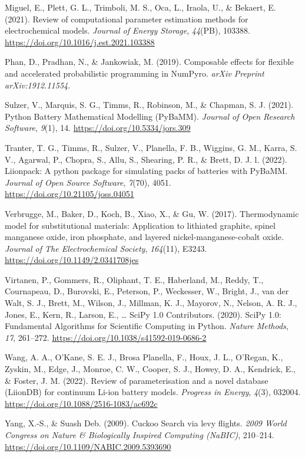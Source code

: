 \documentclass[
]{article}
\newlength{\cslhangindent}
\newenvironment{CSLReferences}[2] %
 {\begin{list}{}{%
  \setlength{\itemindent}{0pt}
  \setlength{\leftmargin}{0pt}
  \setlength{\parsep}{0pt}
  \ifodd #1
   \setlength{\leftmargin}{\cslhangindent}
   \setlength{\itemindent}{-1\cslhangindent}
  \fi
  \setlength{\itemsep}{#2\baselineskip}}}
 {\end{list}}
\begin{document}
\begin{CSLReferences}{1}{0}
Miguel, E., Plett, G. L., Trimboli, M. S., Oca, L., Iraola, U., \&
Bekaert, E. (2021). Review of computational parameter estimation methods
for electrochemical models. \emph{Journal of Energy Storage},
\emph{44}(PB), 103388. \url{https://doi.org/10.1016/j.est.2021.103388}

Phan, D., Pradhan, N., \& Jankowiak, M. (2019). Composable effects for
flexible and accelerated probabilistic programming in NumPyro.
\emph{arXiv Preprint arXiv:1912.11554}.

Sulzer, V., Marquis, S. G., Timms, R., Robinson, M., \& Chapman, S. J.
(2021). {Python Battery Mathematical Modelling (PyBaMM)}. \emph{Journal
of Open Research Software}, \emph{9}(1), 14.
\url{https://doi.org/10.5334/jors.309}

Tranter, T. G., Timms, R., Sulzer, V., Planella, F. B., Wiggins, G. M.,
Karra, S. V., Agarwal, P., Chopra, S., Allu, S., Shearing, P. R., \&
Brett, D. J. l. (2022). Liionpack: A python package for simulating packs
of batteries with PyBaMM. \emph{Journal of Open Source Software},
\emph{7}(70), 4051. \url{https://doi.org/10.21105/joss.04051}

Verbrugge, M., Baker, D., Koch, B., Xiao, X., \& Gu, W. (2017).
Thermodynamic model for substitutional materials: Application to
lithiated graphite, spinel manganese oxide, iron phosphate, and layered
nickel-manganese-cobalt oxide. \emph{Journal of The Electrochemical
Society}, \emph{164}(11), E3243.
\url{https://doi.org/10.1149/2.0341708jes}

Virtanen, P., Gommers, R., Oliphant, T. E., Haberland, M., Reddy, T.,
Cournapeau, D., Burovski, E., Peterson, P., Weckesser, W., Bright, J.,
van der Walt, S. J., Brett, M., Wilson, J., Millman, K. J., Mayorov, N.,
Nelson, A. R. J., Jones, E., Kern, R., Larson, E., \ldots{} SciPy 1.0
Contributors. (2020). {{SciPy} 1.0: Fundamental Algorithms for
Scientific Computing in Python}. \emph{Nature Methods}, \emph{17},
261--272. \url{https://doi.org/10.1038/s41592-019-0686-2}

Wang, A. A., O'Kane, S. E. J., Brosa Planella, F., Houx, J. L., O'Regan,
K., Zyskin, M., Edge, J., Monroe, C. W., Cooper, S. J., Howey, D. A.,
Kendrick, E., \& Foster, J. M. (2022). Review of parameterisation and a
novel database {(LiionDB)} for continuum {Li-ion} battery models.
\emph{Progress in Energy}, \emph{4}(3), 032004.
\url{https://doi.org/10.1088/2516-1083/ac692c}

Yang, X.-S., \& Suash Deb. (2009). Cuckoo {Search} via levy flights.
\emph{2009 {World} {Congress} on {Nature} \& {Biologically} {Inspired}
{Computing} ({NaBIC})}, 210--214.
\url{https://doi.org/10.1109/NABIC.2009.5393690}

\end{CSLReferences}
\end{document}

